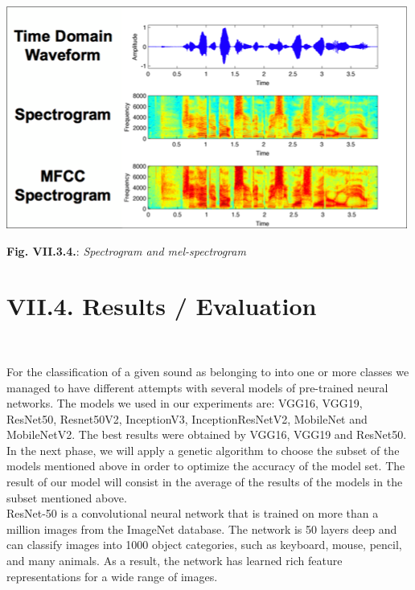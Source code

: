 \documentclass[11pt, a4papper]{report}
\theoremstyle{plain}
\theoremstyle{definition}
\theoremstyle{definition}
\theoremstyle{proposition}
\begin{document}
\begin{center}
\includegraphics[scale=0.8]{sound-representation.png}
\end{center}
\begin{center}
\textbf{Fig. VII.3.4.}: \textit{Spectrogram and mel-spectrogram}
\end{center}

\section*{VII.4. Results /  Evaluation}
\

For the classification of a given sound as belonging to into one or more classes we managed to have different attempts with several models of pre-trained neural networks. The models we used in our experiments are: VGG16, VGG19, ResNet50, Resnet50V2, InceptionV3, InceptionResNetV2, MobileNet and MobileNetV2. The best results were obtained by VGG16, VGG19 and ResNet50. In the next phase, we will apply a genetic algorithm to choose the subset of the models mentioned above in order to optimize the accuracy of the model set. The result of our model will consist in the average of the results of the models in the subset mentioned above.
\\

ResNet-50 is a convolutional neural network that is trained on more than a million images from the ImageNet database. The network is 50 layers deep and can classify images into 1000 object categories, such as keyboard, mouse, pencil, and many animals. As a result, the network has learned rich feature representations for a wide range of images.
\end{document}
